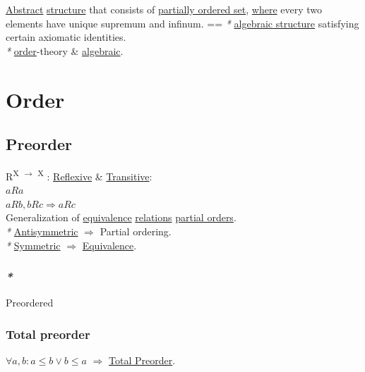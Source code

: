 \documentclass[a4paper,14pt,oneside]{book}
\begin{document}
\hyperref[org939195a]{Abstract} \hyperref[orgffe6855]{structure} that consists of \hyperref[org576a4f6]{partially ordered set}, \hyperref[org12b3f26]{where} every two elements have unique supremum and infinum. == \emph{*} \hyperref[orgbf3401b]{algebraic structure} satisfying certain axiomatic identities.\\
\emph{*} \hyperref[orgd1a98a3]{order}-theory \& \hyperref[orgb6b24df]{algebraic}.\\

\section{\label{orgd1a98a3}Order}
\label{sec:org1b4d3c7}

\subsection{\label{org459d163}Preorder}
\label{sec:org020f4dd}

R\textsuperscript{X \(\to\) X} : \hyperref[org65baa48]{Reflexive} \& \hyperref[orga52134c]{Transitive}:\\
\(aRa\)\\
\(aRb, bRc \Rightarrow aRc\)\\

Generalization of \hyperref[org884f16c]{equivalence} \hyperref[org2049f4a]{relations} \hyperref[orgb9d2acd]{partial orders}.\\

\emph{*} \hyperref[org68e0dbc]{Antisymmetric} \(\Rightarrow\) Partial ordering.\\
\emph{*} \hyperref[orgfd0a88e]{Symmetric} \(\Rightarrow\) \hyperref[org884f16c]{Equivalence}.\\

\subsubsection{\emph{*}}
\label{sec:orge392e00}

\label{orge35fb5f}Preordered\\

\subsubsection{\label{orgba3ad1e}Total preorder}
\label{sec:org543ff28}

\(\forall a,b : a \le b \lor b \le a\) \(\Rightarrow\) \hyperref[orgba3ad1e]{Total Preorder}.\\
\end{document}
